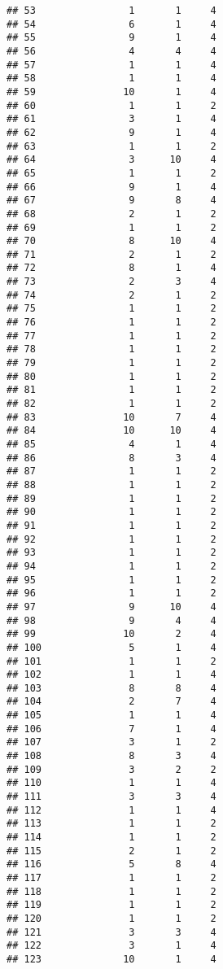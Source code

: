 \documentclass[
]{article}
\begin{document}
\begin{verbatim}
## 53                1       1     4
## 54                6       1     4
## 55                9       1     4
## 56                4       4     4
## 57                1       1     4
## 58                1       1     4
## 59               10       1     4
## 60                1       1     2
## 61                3       1     4
## 62                9       1     4
## 63                1       1     2
## 64                3      10     4
## 65                1       1     2
## 66                9       1     4
## 67                9       8     4
## 68                2       1     2
## 69                1       1     2
## 70                8      10     4
## 71                2       1     2
## 72                8       1     4
## 73                2       3     4
## 74                2       1     2
## 75                1       1     2
## 76                1       1     2
## 77                1       1     2
## 78                1       1     2
## 79                1       1     2
## 80                1       1     2
## 81                1       1     2
## 82                1       1     2
## 83               10       7     4
## 84               10      10     4
## 85                4       1     4
## 86                8       3     4
## 87                1       1     2
## 88                1       1     2
## 89                1       1     2
## 90                1       1     2
## 91                1       1     2
## 92                1       1     2
## 93                1       1     2
## 94                1       1     2
## 95                1       1     2
## 96                1       1     2
## 97                9      10     4
## 98                9       4     4
## 99               10       2     4
## 100               5       1     4
## 101               1       1     2
## 102               1       1     4
## 103               8       8     4
## 104               2       7     4
## 105               1       1     4
## 106               7       1     4
## 107               3       1     2
## 108               8       3     4
## 109               3       2     2
## 110               1       1     4
## 111               3       3     4
## 112               1       1     4
## 113               1       1     2
## 114               1       1     2
## 115               2       1     2
## 116               5       8     4
## 117               1       1     2
## 118               1       1     2
## 119               1       1     2
## 120               1       1     2
## 121               3       3     4
## 122               3       1     4
## 123              10       1     4

\end{verbatim}
\end{document}
